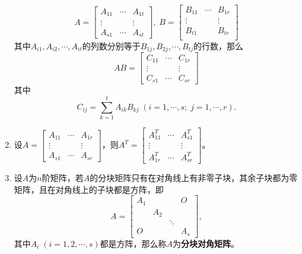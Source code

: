 \begin{enumerate}
\begin{equation*}
    A = \left[\begin{array}{ccc}
      A_{11} & \cdots & A_{1t} \\
      \vdots & & \vdots \\
      A_{s1} & \cdots & A_{st}
    \end{array}\right], \;
    B = \left[\begin{array}{ccc}
      B_{11} & \cdots & B_{1r} \\
      \vdots &  & \vdots \\
      B_{t1} &  & B_{tr} \\
    \end{array}\right]
  \end{equation*}
  其中$A_{i1}, A_{i2}, \cdots, A_{it}$的列数分别等于$B_{1j}, B_{2j}, \cdots, B_{tj}$的行数，那么
  \begin{equation*}
    AB = \left[\begin{array}{ccc}
      C_{11} & \cdots & C_{1r} \\
      \vdots &  & \vdots \\
      C_{s1} & \cdots & C_{sr}
    \end{array}\right]
  \end{equation*}
  其中
  \begin{equation*}
    C_{ij} = \sum_{k=1}^t A_{ik}B_{kj} \; (i = 1, \cdots, s; \; j = 1,\cdots,r).
  \end{equation*}
  \item 设$\displaystyle A = \left[\begin{array}{ccc}
    A_{11} & \cdots & A_{1r} \\
    \vdots & & \vdots \\
    A_{s1} & \cdots & A_{sr}
  \end{array}\right]$，则$A^T = \left[\begin{array}{ccc}
    A_{11}^T & \cdots & A_{s1}^T \\
    \vdots &  & \vdots \\
    A_{1r}^T & \cdots  & A_{sr}^T
  \end{array}\right]$。
  \item 设$A$为$n$阶矩阵，若$A$的分块矩阵只有在对角线上有非零子块，其余子块都为零矩阵，且在对角线上的子块都是方阵，即
  \begin{equation*}
    A = \left[\begin{array}{cccc}
      A_1 & & & O \\
      & A_2 & & \\
      & & \ddots & \\
      O & & & A_s
    \end{array}\right],
  \end{equation*}
  其中$A_i\;(i = 1,2,\cdots,s)$都是方阵，那么称$A$为\textbf{分块对角矩阵}。
\end{enumerate}

